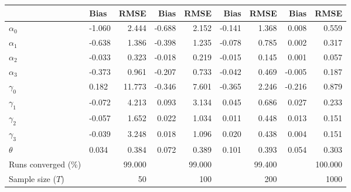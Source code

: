 
\begin{tabular}[t]{llrrrrrrr}
\toprule
  & Bias & RMSE & Bias & RMSE & Bias & RMSE & Bias & RMSE\\
\midrule
$\alpha_{0}$ & -1.060 & 2.444 & -0.688 & 2.152 & -0.141 & 1.368 & 0.008 & 0.559\\
$\alpha_{1}$ & -0.638 & 1.386 & -0.398 & 1.235 & -0.078 & 0.785 & 0.002 & 0.317\\
$\alpha_{2}$ & -0.033 & 0.323 & -0.018 & 0.219 & -0.015 & 0.145 & 0.001 & 0.057\\
$\alpha_{3}$ & -0.373 & 0.961 & -0.207 & 0.733 & -0.042 & 0.469 & -0.005 & 0.187\\
$\gamma_{0}$ & 0.182 & 11.773 & -0.346 & 7.601 & -0.365 & 2.246 & -0.216 & 0.879\\
$\gamma_{1}$ & -0.072 & 4.213 & 0.093 & 3.134 & 0.045 & 0.686 & 0.027 & 0.233\\
$\gamma_{2}$ & -0.057 & 1.652 & 0.022 & 1.034 & 0.011 & 0.448 & 0.013 & 0.151\\
$\gamma_{3}$ & -0.039 & 3.248 & 0.018 & 1.096 & 0.020 & 0.438 & 0.004 & 0.151\\
$\theta$ & 0.034 & 0.384 & 0.072 & 0.389 & 0.101 & 0.393 & 0.054 & 0.303\\
Runs converged (\%) &  & 99.000 &  & 99.000 &  & 99.400 &  & 100.000\\
Sample size ($T$) &  & 50 &  & 100 &  & 200 &  & 1000\\
\bottomrule
\end{tabular}
